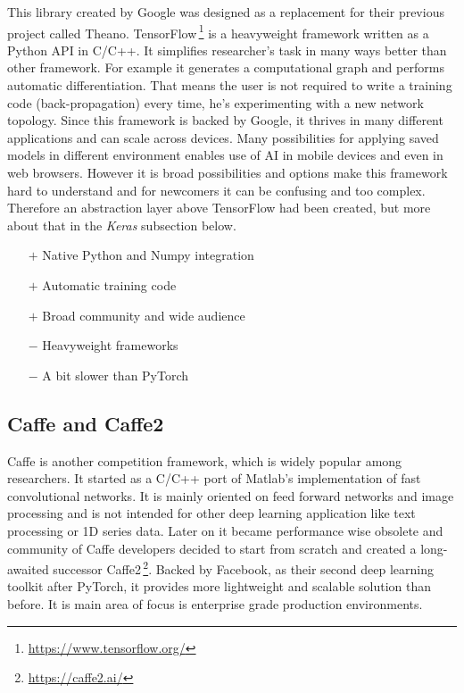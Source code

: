 This library created by Google was designed as a replacement for their previous project called Theano. TensorFlow\,\footnote{\url{https://www.tensorflow.org/}} is a heavyweight framework written as a Python API in C/C++. It simplifies researcher's task in many ways better than other framework. For example it generates a computational graph and performs automatic differentiation. That means the user is not required to write a training code (back-propagation) every time, he's experimenting with a new network topology. Since this framework is backed by Google, it thrives in many different applications and can scale across devices. Many possibilities for applying saved models in different environment enables use of AI in mobile devices and even in web browsers. However it is broad possibilities and options make this framework hard to understand and for newcomers it can be confusing and too complex. Therefore an abstraction layer above TensorFlow had been created, but more about that in the \textit{Keras} subsection below.

\begin{itemize}
    \item[$\boldsymbol{+}$] Native Python and Numpy integration
    \item[$\boldsymbol{+}$] Automatic training code
    \item[$\boldsymbol{+}$] Broad community and wide audience
    \item[$\boldsymbol{-}$] Heavyweight frameworks
    \item[$\boldsymbol{-}$] A bit slower than PyTorch
\end{itemize}

\subsection{Caffe and Caffe2}

Caffe is another competition framework, which is widely popular among researchers. It started as a C/C++ port of Matlab's implementation of fast convolutional networks. It is mainly oriented on feed forward networks and image processing and is not intended for other deep learning application like text processing or 1D series data. Later on it became performance wise obsolete and community of Caffe developers decided to start from scratch and created a long-awaited successor Caffe2\,\footnote{\url{https://caffe2.ai/}}. Backed by Facebook, as their second deep learning toolkit after PyTorch, it provides more lightweight and scalable solution than before. It is main area of focus is enterprise grade production environments.

